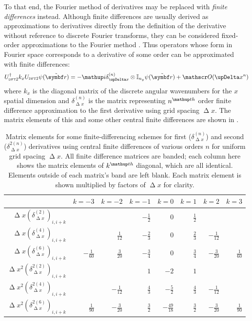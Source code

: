 To that end, the Fourier method of derivatives may be replaced with \emph{finite differences} instead. Although finite differences are usually derived as approximations to derivatives directly from the definition of the derivative without reference to discrete Fourier transforms, they can be considered fixed-order approximations to the Fourier method \cite{fornberg_pseudospectral_1987}. Thus operators whose form in Fourier space corresponds to a derivative of some order can be approximated with finite differences:
\begin{align}
U^\dagger_{\textsc{dft2}} k_x U_{\textsc{dft2}}\psi(\tilde{\vec r}) = 
-\ii\delta^{(n)}_{\upDelta x} \otimes \mathbb{I}_{n_y}\psi(\tilde{\vec r}) + \Ord{\upDelta x^n}
\end{align} 
where $k_x$ is the diagonal matrix of the discrete angular wavenumbers for the $x$ spatial dimension and $\delta^{(n)}_{\upDelta x}$ is the matrix representing $n^\up{th}$ order finite difference approximation to the first derivative using grid spacing $\upDelta x$. The matrix elements of this and some other central finite differences are shown in .

\begin{table}\label{table:fd_matrixels}
\centering
\begin{tabular}[c]{|r||rrrrrrr|}
\hline
 & $k=-3$ & $k=-2$ & $k=-1$ & $k=0$ & $k=1$ & $k=2$ & $k=3$\\
\hline
$\upDelta x\left(\delta^{(2)}_{\upDelta x}\right)_{i, i+k}$ 
& & & $-\frac{1}{2}$ & $0$ & $\frac{1}{2}$ & & \\
$\upDelta x\left(\delta^{(4)}_{\upDelta x}\right)_{i, i+k}$ 
& & $\frac{1}{12}$ & $-\frac{2}{3}$ & $0$ & $\frac{2}{3}$ & $-\frac{1}{12}$ & \\
$\upDelta x\left(\delta^{(6)}_{\upDelta x}\right)_{i, i+k}$ 
& $-\frac{1}{60}$ & $\frac{3}{20}$ & $-\frac{3}{4}$ & $0$ & $\frac{3}{4}$ & $-\frac{3}{20}$ & $\frac{1}{60}$\\
$\upDelta x^2\left(\delta^{2 (2)}_{\upDelta x}\right)_{i, i+k}$ 
& & & $1$ & $-2$ & $1$ & & \\
$\upDelta x^2\left(\delta^{2 (4)}_{\upDelta x}\right)_{i, i+k}$ 
& & $-\frac{1}{12}$ & $\frac{4}{3}$ & $-\frac{5}{2}$ & $\frac{4}{3}$ & $-\frac{1}{12}$ & \\
$\upDelta x^2\left(\delta^{2 (6)}_{\upDelta x}\right)_{i, i+k}$ 
& $\frac{1}{90}$ & $-\frac{3}{20}$ & $\frac{3}{2}$ & $-\frac{49}{18}$ & $\frac{3}{2}$ & $-\frac{3}{20}$ & $\frac{1}{90}$\\
\hline
\end{tabular}
\caption{Matrix elements \cite{fornberg_generation_1988} for some finite-differencing schemes for first ($\delta^{(n)}_{\upDelta x}$) and second ($\delta^{2 (n)}_{\upDelta x}$) derivatives using central finite differences of various orders $n$ for uniform grid spacing $\upDelta x$. All finite difference matrices are banded; each column here shows the matrix elements of $k^\up{th}$ diagonal, which are all identical. Elements outside of each matrix's band are left blank. Each matrix element is shown multiplied by factors of $\upDelta x$ for clarity.}
\end{table}

